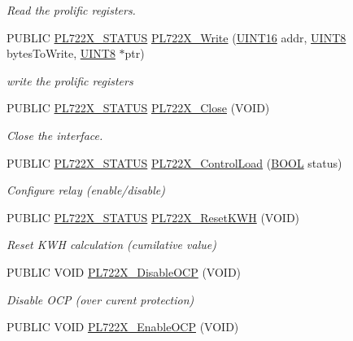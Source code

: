 \begin{DoxyCompactItemize}
\begin{DoxyCompactList}\small\item\em Read the prolific registers. \end{DoxyCompactList}\item 
PUBLIC \hyperlink{a00486_a2bb5dcead34a0fa5b7fca8986b66fa8c}{PL722X\_\-STATUS} \hyperlink{a00486_a42f46804b5e8cdadec695451a4889484}{PL722X\_\-Write} (\hyperlink{a00660_ga09f1a1fb2293e33483cc8d44aefb1eb1}{UINT16} addr, \hyperlink{a00660_gab27e9918b538ce9d8ca692479b375b6a}{UINT8} bytesToWrite, \hyperlink{a00660_gab27e9918b538ce9d8ca692479b375b6a}{UINT8} $\ast$ptr)
\begin{DoxyCompactList}\small\item\em write the prolific registers \end{DoxyCompactList}\item 
PUBLIC \hyperlink{a00486_a2bb5dcead34a0fa5b7fca8986b66fa8c}{PL722X\_\-STATUS} \hyperlink{a00486_a83913c15618c7a31798780209239b49e}{PL722X\_\-Close} (VOID)
\begin{DoxyCompactList}\small\item\em Close the interface. \end{DoxyCompactList}\item 
PUBLIC \hyperlink{a00486_a2bb5dcead34a0fa5b7fca8986b66fa8c}{PL722X\_\-STATUS} \hyperlink{a00486_abec87e3fe5270ae493abd4cfd6085f9c}{PL722X\_\-ControlLoad} (\hyperlink{a00660_ga1f04022c0a182c51c059438790ea138c}{BOOL} status)
\begin{DoxyCompactList}\small\item\em Configure relay (enable/disable) \end{DoxyCompactList}\item 
PUBLIC \hyperlink{a00486_a2bb5dcead34a0fa5b7fca8986b66fa8c}{PL722X\_\-STATUS} \hyperlink{a00486_a5985ef082206431fb4395bf320166f49}{PL722X\_\-ResetKWH} (VOID)
\begin{DoxyCompactList}\small\item\em Reset KWH calculation (cumilative value) \end{DoxyCompactList}\item 
PUBLIC VOID \hyperlink{a00486_a5a2855fdd84c82c174ec61549247332a}{PL722X\_\-DisableOCP} (VOID)
\begin{DoxyCompactList}\small\item\em Disable OCP (over curent protection) \end{DoxyCompactList}\item 
PUBLIC VOID \hyperlink{a00486_a0bc6667f5504eba89f2bf507f1f256ea}{PL722X\_\-EnableOCP} (VOID)

\end{DoxyCompactItemize}
